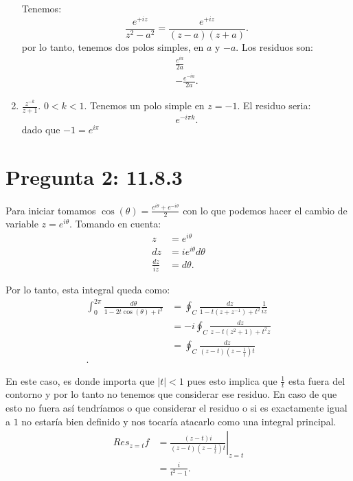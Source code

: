 \documentclass{report}
\begin{document}
\begin{enumerate}
    Tenemos: \[
      \frac{e^{+iz}}{z^2 - a^2} = \frac{e^{+iz}}{\left( z - a \right) \left( z + a \right) }
      .\] por lo tanto, tenemos dos polos simples, en $a$ y $-a$. Los residuos son:
    \begin{align*}
      \frac{e^{ia}}{2a}\\
      -\frac{e^{-ia}}{2a}
    .\end{align*}
  \item $\frac{z^{-k}}{z + 1}$. $0<k<1$. Tenemos un polo simple en $z = -1$. El residuo seria: \[
      e^{-i\pi k}
      .\] dado que $-1 = e^{i\pi}$
\end{enumerate}
\chapter{Pregunta 2: 11.8.3}


Para iniciar tomamos $\cos\left( \theta \right) = \frac{e^{i\theta}+ e^{-i\theta}}{2}$ con lo que podemos hacer el cambio de variable $z = e^{i\theta}$. Tomando en cuenta:
\begin{align*}
  z &= e^{i\theta} \\
  dz &= ie^{i\theta}d\theta \\
  \frac{dz}{iz} &= d\theta
.\end{align*}

Por lo tanto, esta integral queda como:
\begin{align*}
  \int_{0}^{2\pi} \frac{d\theta}{1 - 2t\cos\left( \theta \right) + t^2} &= \oint_{C} \frac{dz}{1-t\left( z + z^{-1} \right) + t^2 }\frac{1}{iz}  \\
  &= -i \oint_{C} \frac{dz}{z - t\left( z^2 + 1 \right) + t^2z}  \\
  &= \oint_{C} \frac{dz}{\left( z - t \right) \left( z - \frac{1}{t} \right)t }  \\
.\end{align*}

En este caso, es donde importa que $\left| t \right| < 1 $ pues esto implica que $\frac{1}{t}$ esta fuera del contorno y por lo tanto no tenemos que considerar ese residuo. En caso de que esto no fuera así tendríamos o que considerar el residuo o si es exactamente igual a $1$ no estaría bien definido y nos tocaría atacarlo como una integral principal. 
\begin{align*}
  Res_{z = t} f &= \left.\frac{\left( z - t \right) i}{\left( z - t \right) \left( z - \frac{1}{t} \right)t}\right|_{z = t} \\
    &= \frac{i}{t^2 - 1} 
.\end{align*}
\end{document}
